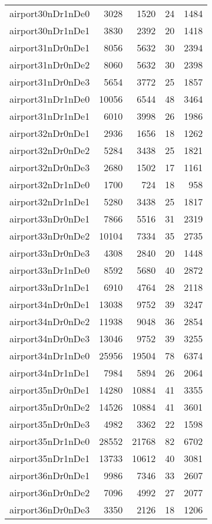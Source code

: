 \begin{tabular}{lrrrr}
airport30nDr1nDe0 & 3028 & 1520 & 24 & 1484 \\
airport30nDr1nDe1 & 3830 & 2392 & 20 & 1418 \\
airport31nDr0nDe1 & 8056 & 5632 & 30 & 2394 \\
airport31nDr0nDe2 & 8060 & 5632 & 30 & 2398 \\
airport31nDr0nDe3 & 5654 & 3772 & 25 & 1857 \\
airport31nDr1nDe0 & 10056 & 6544 & 48 & 3464 \\
airport31nDr1nDe1 & 6010 & 3998 & 26 & 1986 \\
airport32nDr0nDe1 & 2936 & 1656 & 18 & 1262 \\
airport32nDr0nDe2 & 5284 & 3438 & 25 & 1821 \\
airport32nDr0nDe3 & 2680 & 1502 & 17 & 1161 \\
airport32nDr1nDe0 & 1700 & 724 & 18 & 958 \\
airport32nDr1nDe1 & 5280 & 3438 & 25 & 1817 \\
airport33nDr0nDe1 & 7866 & 5516 & 31 & 2319 \\
airport33nDr0nDe2 & 10104 & 7334 & 35 & 2735 \\
airport33nDr0nDe3 & 4308 & 2840 & 20 & 1448 \\
airport33nDr1nDe0 & 8592 & 5680 & 40 & 2872 \\
airport33nDr1nDe1 & 6910 & 4764 & 28 & 2118 \\
airport34nDr0nDe1 & 13038 & 9752 & 39 & 3247 \\
airport34nDr0nDe2 & 11938 & 9048 & 36 & 2854 \\
airport34nDr0nDe3 & 13046 & 9752 & 39 & 3255 \\
airport34nDr1nDe0 & 25956 & 19504 & 78 & 6374 \\
airport34nDr1nDe1 & 7984 & 5894 & 26 & 2064 \\
airport35nDr0nDe1 & 14280 & 10884 & 41 & 3355 \\
airport35nDr0nDe2 & 14526 & 10884 & 41 & 3601 \\
airport35nDr0nDe3 & 4982 & 3362 & 22 & 1598 \\
airport35nDr1nDe0 & 28552 & 21768 & 82 & 6702 \\
airport35nDr1nDe1 & 13733 & 10612 & 40 & 3081 \\
airport36nDr0nDe1 & 9986 & 7346 & 33 & 2607 \\
airport36nDr0nDe2 & 7096 & 4992 & 27 & 2077 \\
airport36nDr0nDe3 & 3350 & 2126 & 18 & 1206 \\

\end{tabular}
